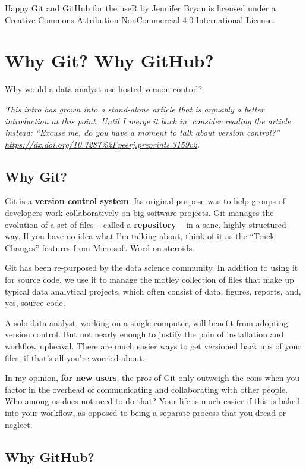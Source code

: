 \documentclass[
]{book}
\begin{document}
{Happy Git and GitHub for the useR} by Jennifer Bryan is licensed under a Creative Commons Attribution-NonCommercial 4.0 International License.

\chapter{Why Git? Why GitHub?}\label{big-picture}

Why would a data analyst use hosted version control?

\emph{This intro has grown into a stand-alone article that is arguably a better introduction at this point. Until I merge it back in, consider reading the article instead: ``Excuse me, do you have a moment to talk about version control?'' \url{https://dx.doi.org/10.7287\%2Fpeerj.preprints.3159v2}.}

\section{Why Git?}\label{why-git}

\href{http://git-scm.com}{Git} is a \textbf{version control system}. Its original purpose was to help groups of developers work collaboratively on big software projects. Git manages the evolution of a set of files -- called a \textbf{repository} -- in a sane, highly structured way. If you have no idea what I'm talking about, think of it as the ``Track Changes'' features from Microsoft Word on steroids.

Git has been re-purposed by the data science community. In addition to using it for source code, we use it to manage the motley collection of files that make up typical data analytical projects, which often consist of data, figures, reports, and, yes, source code.

A solo data analyst, working on a single computer, will benefit from adopting version control. But not nearly enough to justify the pain of installation and workflow upheaval. There are much easier ways to get versioned back ups of your files, if that's all you're worried about.

In my opinion, \textbf{for new users}, the pros of Git only outweigh the cons when you factor in the overhead of communicating and collaborating with other people. Who among us does not need to do that? Your life is much easier if this is baked into your workflow, as opposed to being a separate process that you dread or neglect.

\section{Why GitHub?}\label{why-github}
\end{document}
